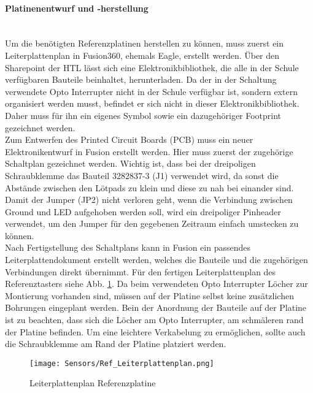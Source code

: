 \paragraph{Platinenentwurf und -herstellung} \mbox{}\\
Um die benötigten Referenzplatinen herstellen zu können, muss zuerst ein Leiterplattenplan in Fusion360, ehemals Eagle, erstellt werden. Über den Sharepoint der HTL lässt sich eine Elektronikbibliothek, die alle in der Schule verfügbaren Bauteile beinhaltet, herunterladen. Da der in der Schaltung verwendete Opto Interrupter nicht in der Schule verfügbar ist, sondern extern organisiert werden musst, befindet er sich nicht in dieser Elektronikbibliothek. Daher muss für ihn ein eigenes Symbol sowie ein dazugehöriger Footprint gezeichnet werden.\\
Zum Entwerfen des Printed Circuit Boards (PCB) muss ein neuer Elektronikentwurf in Fusion erstellt werden. Hier muss zuerst der zugehörige Schaltplan gezeichnet werden. Wichtig ist, dass bei der dreipoligen Schraubklemme das Bauteil 3282837-3 (J1) verwendet wird, da sonst die Abstände zwischen den Lötpads zu klein und diese zu nah bei einander sind. Damit der Jumper (JP2) nicht verloren geht, wenn die Verbindung zwischen Ground und LED aufgehoben werden soll, wird ein dreipoliger Pinheader verwendet, um den Jumper für den gegebenen Zeitraum einfach umstecken zu können.\\
Nach Fertigstellung des Schaltplans kann in Fusion ein passendes Leiterplattendokument erstellt werden, welches die Bauteile und die zugehörigen Verbindungen direkt übernimmt. Für den fertigen Leiterplattenplan des Referenztasters siehe Abb. \ref{Ref_LPPlan}. Da beim verwendeten Opto Interrupter Löcher zur Montierung vorhanden sind, müssen auf der Platine selbst keine zusätzlichen Bohrungen eingeplant werden. Bein der Anordnung der Bauteile auf der Platine ist zu beachten, dass sich die Löcher am Opto Interrupter, am schmäleren rand der Platine befinden. Um eine leichtere Verkabelung zu ermöglichen, sollte auch die Schraubklemme am Rand der Platine platziert werden.

\begin{figure}[H]
    \centering
    \texttt{[image: Sensors/Ref\_Leiterplattenplan.png]}
    \caption{Leiterplattenplan Referenzplatine}
    \label{Ref_LPPlan}
\end{figure}

